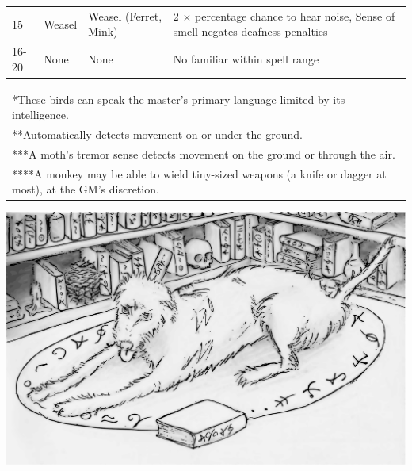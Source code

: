 \begin{minipage}{\textwidth}
\begin{tabular}{|p{}|p{}|p{}|p{}|}
\rowcolor[gray]{.9}15	& Weasel	& Weasel (Ferret, Mink)	& 2 $\times$ percentage chance to hear noise, Sense of smell negates deafness penalties \\
16-20	& None	& None	& No familiar within spell range \\
\hline
\end{tabular}
\noindent\begin{tabular}{p{}}
*These birds can speak the master's primary language limited by its intelligence. \\
**Automatically detects movement on or under the ground. \\
***A moth's tremor sense detects movement on the ground or through the air. \\
****A monkey may be able to wield tiny-sized weapons (a knife or dagger at most), at the GM's discretion. \\
\end{tabular}\vspace{.5em}
\end{minipage}

\noindent\includegraphics[width=\columnwidth]{fiona.pdf}\label{fiona}

